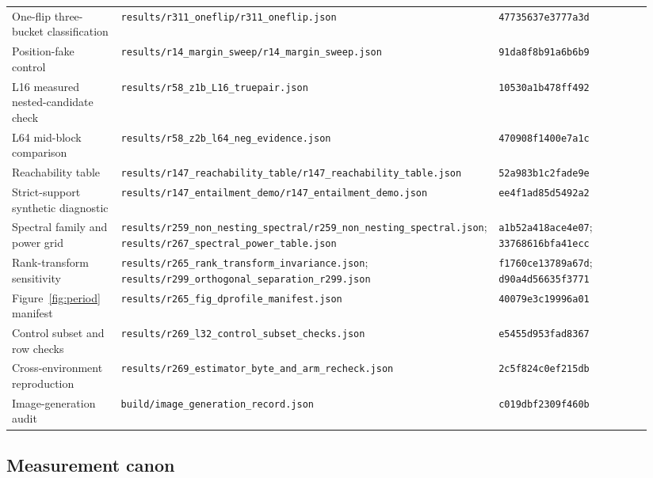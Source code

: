 \documentclass{article}
\newcommand{\ap}[1]{\nolinkurl{#1}}
\begin{document}
\begin{longtable}{@{}>{\raggedright\arraybackslash}p{0.17\linewidth}
                       >{\raggedright\arraybackslash}p{0.53\linewidth}
                       >{\raggedright\arraybackslash}p{0.24\linewidth}@{}}
One-flip three-bucket classification & \ap{results/r311_oneflip/r311_oneflip.json} & \ap{47735637e3777a3d} \\
Position-fake control & \ap{results/r14_margin_sweep/r14_margin_sweep.json} & \ap{91da8f8b91a6b6b9} \\
L16 measured nested-candidate check & \ap{results/r58_z1b_L16_truepair.json} & \ap{10530a1b478ff492} \\
L64 mid-block comparison & \ap{results/r58_z2b_l64_neg_evidence.json} & \ap{470908f1400e7a1c} \\
Reachability table & \ap{results/r147_reachability_table/r147_reachability_table.json} & \ap{52a983b1c2fade9e} \\
Strict-support synthetic diagnostic & \ap{results/r147_entailment_demo/r147_entailment_demo.json} & \ap{ee4f1ad85d5492a2} \\
Spectral family and power grid & \ap{results/r259_non_nesting_spectral/r259_non_nesting_spectral.json}; \ap{results/r267_spectral_power_table.json} & \ap{a1b52a418ace4e07}; \ap{33768616bfa41ecc} \\
Rank-transform sensitivity & \ap{results/r265_rank_transform_invariance.json}; \ap{results/r299_orthogonal_separation_r299.json} & \ap{f1760ce13789a67d}; \ap{d90a4d56635f3771} \\
Figure~\ref{fig:period} manifest & \ap{results/r265_fig_dprofile_manifest.json} & \ap{40079e3c19996a01} \\
Control subset and row checks & \ap{results/r269_l32_control_subset_checks.json} & \ap{e5455d953fad8367} \\
Cross-environment reproduction & \ap{results/r269_estimator_byte_and_arm_recheck.json} & \ap{2c5f824c0ef215db} \\
Image-generation audit & \ap{build/image_generation_record.json} & \ap{c019dbf2309f460b} \\
\end{longtable}
\endgroup

\subsection{Measurement canon}\label{sec:canon}
\end{document}
